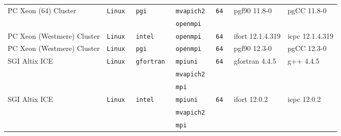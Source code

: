 \begin{longtable}{lllllll}
PC Xeon (64) Cluster  &\tt Linux  &\tt pgi          &\tt mvapich2   &\tt 64              & pgf90 \footnotesize 11.8-0         & pgCC \footnotesize 11.8-0       \\ %
                      &           &                 &\tt openmpi    &                    &                                    &                                 \\
PC Xeon (Westmere) Cluster&\tt Linux  &\tt intel    &\tt openmpi    &\tt 64              & ifort \footnotesize 12.1.4.319     & icpc \footnotesize 12.1.4.319   \\ %
PC Xeon (Westmere) Cluster&\tt Linux  &\tt pgi      &\tt openmpi    &\tt 64              & pgf90 \footnotesize 12.3-0         & pgCC \footnotesize 12.3-0       \\ %
SGI Altix ICE         &\tt Linux  &\tt gfortran     &\tt mpiuni     &\tt 64              & gfortran \footnotesize 4.4.5       & g++ \footnotesize 4.4.5         \\ %
                      &           &                 &\tt mvapich2   &                    &                                    &                                 \\
                      &           &                 &\tt mpi        &                    &                                    &                                 \\
SGI Altix ICE         &\tt Linux  &\tt intel        &\tt mpiuni     &\tt 64              & ifort \footnotesize 12.0.2         & icpc \footnotesize 12.0.2       \\ %
                      &           &                 &\tt mvapich2   &                    &                                    &                                 \\
                      &           &                 &\tt mpi        &                    &                                    &                                 \\

\end{longtable}
